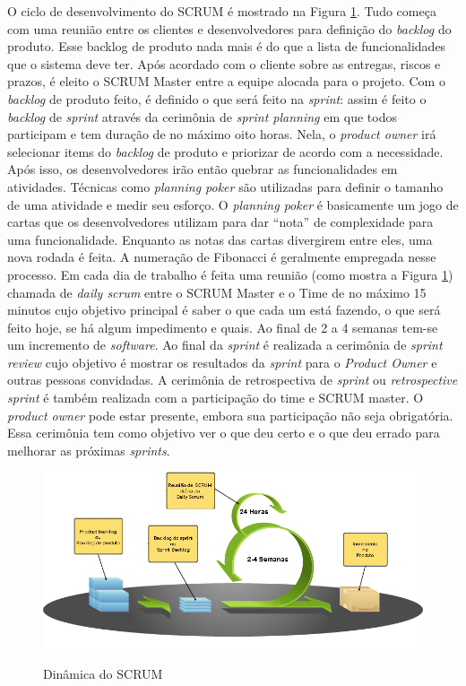 O ciclo de desenvolvimento do SCRUM é mostrado na Figura \ref{fig:scrum}. Tudo começa com uma reunião entre os clientes e desenvolvedores para definição do \textit{backlog} do produto. Esse backlog de produto nada mais é do que a lista de funcionalidades que o sistema deve ter. Após acordado com o cliente sobre as entregas, riscos e prazos, é eleito o SCRUM Master entre a equipe alocada para o projeto. Com o \textit{backlog} de produto feito, é definido o que será feito na \textit{sprint}: assim é feito o \textit{backlog} de \textit{sprint} através da cerimônia de \textit{sprint planning} em que todos participam e tem duração de no máximo oito horas. Nela, o \textit{product owner} irá selecionar items do \textit{backlog} de produto e priorizar de acordo com a necessidade. Após isso, os desenvolvedores irão então quebrar as funcionalidades em atividades. Técnicas como \textit{planning poker} são utilizadas para definir o tamanho de uma atividade e medir seu esforço. O \textit{planning poker} é basicamente um jogo de cartas que os desenvolvedores utilizam para dar ``nota'' de complexidade para uma funcionalidade. Enquanto as notas das cartas divergirem entre eles, uma nova rodada é feita. A numeração de Fibonacci é geralmente empregada nesse processo. Em cada dia de trabalho é feita uma reunião (como mostra a Figura \ref{fig:scrum}) chamada de \textit{daily scrum} entre o SCRUM Master e o Time de no máximo 15 minutos cujo objetivo principal é saber o que cada um está fazendo, o que será feito hoje, se há algum impedimento e quais. Ao final de 2 a 4 semanas tem-se um incremento de \textit{software}. Ao final da \textit{sprint} é realizada a cerimônia de \textit{sprint review} cujo objetivo é mostrar os resultados da \textit{sprint} para o \textit{Product Owner} e outras pessoas convidadas. A cerimônia de retrospectiva de \textit{sprint} ou \textit{retrospective sprint} é também realizada com a participação do time e SCRUM master. O \textit{product owner} pode estar presente, embora sua participação não seja obrigatória. Essa cerimônia tem como objetivo ver o que deu certo e o que deu errado para melhorar as próximas \textit{sprints}. \cite{macedo:12} \cite{cohn:11}

\begin{figure}[htb!]
\begin{center}
\caption{Dinâmica do SCRUM}
\label{fig:scrum}
\includegraphics[width=15cm]{assets/scrum} \\
\end{center}
\end{figure}

